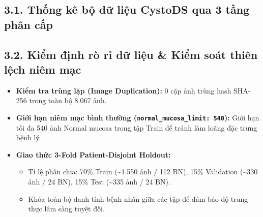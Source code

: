 \documentclass[
  10pt,
  a4paper,
  twocolumn]{article}
\providecommand{\tightlist}{%
  \setlength{\itemsep}{0pt}\setlength{\parskip}{0pt}}
\begin{document}
\subsection{3.1. Thống kê bộ dữ liệu CystoDS qua 3 tầng phân
cấp}\label{thux1ed1ng-kuxea-bux1ed9-dux1eef-liux1ec7u-cystods-qua-3-tux1ea7ng-phuxe2n-cux1ea5p}

\begin{table}[htbp]
\centering
\caption{Thống kê mẫu và bệnh nhân bộ dữ liệu CystoDS theo 3 tầng phả hệ.}
\label{tab:table2}
\vspace{2pt}
\end{table}

\subsection{3.2. Kiểm định rò rỉ dữ liệu \& Kiểm soát thiên lệch niêm
mạc}\label{kiux1ec3m-ux111ux1ecbnh-ruxf2-rux1ec9-dux1eef-liux1ec7u-kiux1ec3m-souxe1t-thiuxean-lux1ec7ch-niuxeam-mux1ea1c}

\begin{itemize}
\tightlist
\item
  \textbf{Kiểm tra trùng lặp (Image Duplication):} 0 cặp ảnh trùng hash
  SHA-256 trong toàn bộ 8.067 ảnh.
\item
  \textbf{Giới hạn niêm mạc bình thường
  (\texttt{normal\_mucosa\_limit:\ 540}):} Giới hạn tối đa 540 ảnh
  Normal mucosa trong tập Train để tránh làm loãng đặc trưng bệnh lý.
\item
  \textbf{Giao thức 3-Fold Patient-Disjoint Holdout:}

  \begin{itemize}
  \tightlist
  \item
    Tỉ lệ phân chia: 70\% Train (\textasciitilde1.550 ảnh / 112 BN),
    15\% Validation (\textasciitilde330 ảnh / 24 BN), 15\% Test
    (\textasciitilde335 ảnh / 24 BN).
  \item
    Khóa toàn bộ danh tính bệnh nhân giữa các tập để đảm bảo độ trung
    thực lâm sàng tuyệt đối.
  \end{itemize}
\end{itemize}
\end{document}
